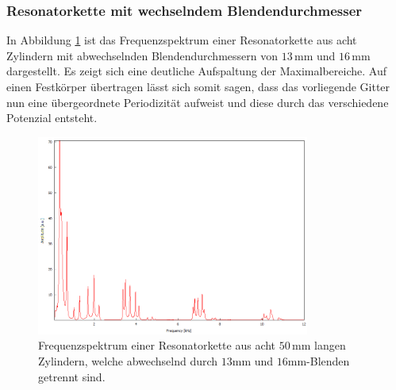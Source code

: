 \subsubsection*{Resonatorkette mit wechselndem Blendendurchmesser}
In Abbildung \ref{fig:abwech_blende} ist das Frequenzspektrum einer Resonatorkette aus acht Zylindern mit abwechselnden Blendendurchmessern
von $13\,$mm und $16\,$mm dargestellt. Es zeigt sich eine deutliche Aufspaltung der Maximalbereiche.
Auf einen Festkörper übertragen lässt sich somit sagen, dass das vorliegende Gitter nun eine übergeordnete Periodizität aufweist und diese durch
das verschiedene Potenzial entsteht.

\begin{figure}
    \center
    \includegraphics[width=0.8\textwidth]{data/Festkoerper/periodisch/Spektrum_8_13mm_16mm_50.png}
    \caption{Frequenzspektrum einer Resonatorkette aus acht $50\,$mm langen Zylindern, welche abwechselnd durch $13$mm und $16$mm-Blenden getrennt sind.}
    \label{fig:abwech_blende}
\end{figure}
